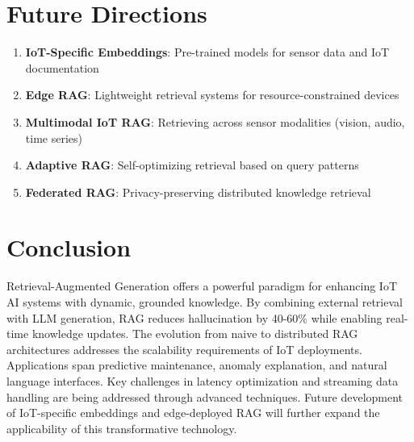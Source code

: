 \documentclass[12pt,a4paper]{article}
\begin{document}
\section{Future Directions}

\begin{enumerate}
    \item \textbf{IoT-Specific Embeddings}: Pre-trained models for sensor data and IoT documentation
    \item \textbf{Edge RAG}: Lightweight retrieval systems for resource-constrained devices
    \item \textbf{Multimodal IoT RAG}: Retrieving across sensor modalities (vision, audio, time series)
    \item \textbf{Adaptive RAG}: Self-optimizing retrieval based on query patterns
    \item \textbf{Federated RAG}: Privacy-preserving distributed knowledge retrieval
\end{enumerate}

\section{Conclusion}

Retrieval-Augmented Generation offers a powerful paradigm for enhancing IoT AI systems with dynamic, grounded knowledge. By combining external retrieval with LLM generation, RAG reduces hallucination by 40-60\% while enabling real-time knowledge updates. The evolution from naive to distributed RAG architectures addresses the scalability requirements of IoT deployments. Applications span predictive maintenance, anomaly explanation, and natural language interfaces. Key challenges in latency optimization and streaming data handling are being addressed through advanced techniques. Future development of IoT-specific embeddings and edge-deployed RAG will further expand the applicability of this transformative technology.
\end{document}
